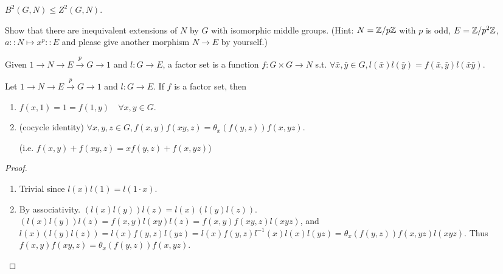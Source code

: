\begin{exercise}
  $B^2(G, N) \le Z^2(G, N)$.
\end{exercise}
\begin{exercise}
  Show that there are inequivalent  extensions of $N$ by $G$ with isomorphic
  middle groups.
  (Hint: $N={\mathbb{Z}}/{p\mathbb{Z}}$ with $p$ is odd, $E={\mathbb{Z}}/{p^2\mathbb{Z}}$,
  $a:: N \mapsto x^p::E$ and please give another morphism $N\to E$ by yourself.)
\end{exercise}

\begin{definition}
  Given $1\to N\to E\xrightarrow{p} G\to 1$ and $l: G\to E$, a factor set is
  a function $f: G\times G \to N$ s.t.
  $\forall \bar{x}, \bar{y}\in G, l(\bar{x})l(\bar{y})
  = f(\bar{x}, \bar{y})l(\bar{x}\bar{y})$.
\end{definition}

\begin{prop}
  Let $1\to N \to E\xrightarrow{p} G\to 1$ and $l: G\to E$.
  If $f$ is a factor set, then
  \begin{enumerate}[(1)]
    \item $f(x, 1) = 1 = f(1, y) \quad \forall x, y\in G$.
    \item (cocycle identity) $\forall x,y,z\in G,
      f(x,y)f(xy, z)
      = \theta_{x}(f(y, z))f(x, yz)$.

      (i.e. $f(x, y) + f(xy,z)
      = xf(y,z) + f(x, yz)$)
  \end{enumerate}
  \begin{proof} \mbox{}
    \begin{enumerate}[(1)]
      \item Trivial since $l(x)l(1) = l(1 \cdot x)$.
      \item By associativity. $(l(x)l(y))l(z) = l(x)(l(y)l(z))$. \\
        $(l(x)l(y))l(z) = f(x, y) l(xy) l(z) = f(x, y) f(xy, z) l(xyz)$, and \\
        $l(x)(l(y)l(z)) = l(x) f(y, z) l(yz) = l(x) f(y, z) l^{-1}(x) l(x) l(yz)
        = \theta_x(f(y, z)) f(x, yz) l(xyz)$.
        Thus $f(x, y) f(xy, z) = \theta_x(f(y, z)) f(x, yz)$.
        \qedhere
    \end{enumerate}
  \end{proof}
  \label{prop:factor-set}
\end{prop}

